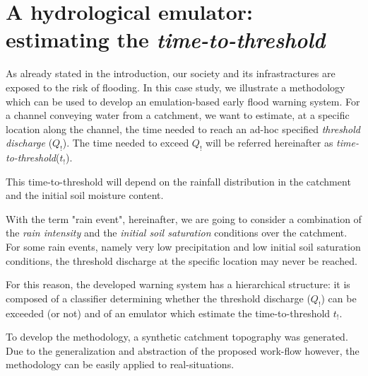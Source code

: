 \newpage

\section{A hydrological emulator: estimating the \textit{time-to-threshold}}
\label{sec:hydrological_emulator}




As already stated in the introduction, our society and its infrastractures are exposed to the risk of flooding.
In this case study, we illustrate a methodology which can be used to develop an emulation-based early flood warning system.
For a channel conveying water from a catchment, we want to estimate, at a specific location along the channel, the time needed to reach an ad-hoc specified \emph{threshold discharge} ($Q_!$). 
The time needed to exceed $Q_!$ will be referred hereinafter as \emph{time-to-threshold}($t_!$). 

This time-to-threshold will depend on the rainfall distribution in the catchment and the initial soil moisture content.

With the term "rain event", hereinafter, we are going to consider a combination of the \emph{rain intensity} and the \emph{initial soil saturation} conditions over the catchment. 
For some rain events, namely very low precipitation and low initial soil saturation conditions, the threshold discharge at the specific location may never be reached.

For this reason, the developed warning system has a hierarchical structure: it is composed of a classifier determining whether the threshold discharge ($Q_!$) can be exceeded (or not) and of an emulator which estimate the time-to-threshold $t_!$.

To develop the methodology, a synthetic catchment topography was generated. Due to the generalization and abstraction of the proposed work-flow however, the methodology can be easily applied to real-situations. 
 
